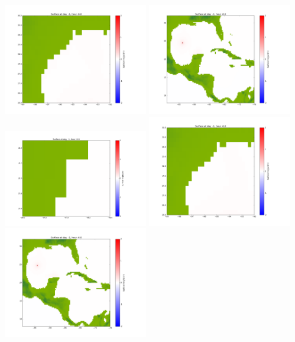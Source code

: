 \documentclass[11pt]{article}
\begin{document}
\includegraphics[width=0.475\textwidth]{frame0008fig1002.png}
\vskip 10pt 
\includegraphics[width=0.475\textwidth]{frame0008fig1003.png}
\vskip 10pt 
\includegraphics[width=0.475\textwidth]{frame0009fig1001.png}
\includegraphics[width=0.475\textwidth]{frame0009fig1002.png}
\vskip 10pt 
\includegraphics[width=0.475\textwidth]{frame0009fig1003.png}
\end{document}
